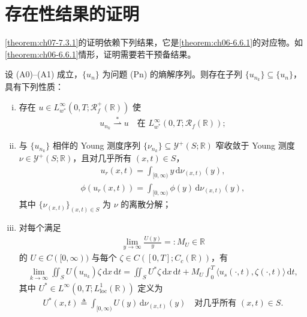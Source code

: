 \documentclass[../../main.tex]{subfiles}%
\begin{document}
\section{存在性结果的证明}\label{section:ch07-存在性证明}

\cref{theorem:ch07-7.3.1}的证明依赖下列结果，它是\cref{theorem:ch06-6.6.1}的对应物。如\cref{theorem:ch06-6.6.1}情形，证明需要若干预备结果。

\begin{theorem}\label{theorem:ch07-7.5.1}
设 (A0)--(A1) 成立，$\{u_n\}$ 为问题 (Pn) 的熵解序列。则存在子列 $\{u_{n_k}\}\subseteq\{u_n\}$，具有下列性质：
\begin{enumerate}[(i)]
\item 存在 $u\in L^\infty_{w^*}(0,T;\mathscr{R}_f^+(\mathbb{R}))$ 使
\begin{align}
u_{n_k}\stackrel{*}{\rightharpoonup}u\quad\text{在 }L^\infty_{w^*}(0,T;\mathscr{R}_f(\mathbb{R})); \label{align:ch07-7.88}
\end{align}
\item 与 $\{u_{n_k}\}$ 相伴的 Young 测度序列 $\{\nu_{n_k}\}\subseteq\mathcal{Y}^+(S;\mathbb{R})$ 窄收敛于 Young 测度 $\nu\in\mathcal{Y}^+(S;\mathbb{R})$，且对几乎所有 $(x,t)\in S$，
\begin{align}
u_r(x,t)=\int_{[0,\infty)}y\,\mathrm{d}\nu_{(x,t)}(y), \label{align:ch07-7.89}
\end{align}
\begin{align}
\phi(u_r(x,t))=\int_{[0,\infty)}\phi(y)\,\mathrm{d}\nu_{(x,t)}(y), \label{align:ch07-7.90}
\end{align}
其中 $\{\nu_{(x,t)}\}_{(x,t)\in S}$ 为 $\nu$ 的离散分解；
\item 对每个满足
\begin{align}
\lim_{y\to\infty}\frac{U(y)}{y}=:M_U\in\mathbb{R} \label{align:ch07-7.91}
\end{align}
的 $U\in C([0,\infty))$ 与每个 $\zeta\in C([0,T];C_c(\mathbb{R}))$，有
\begin{align}
\lim_{k\to\infty}\iint_S U(u_{n_k})\zeta\,\mathrm{d}x\,\mathrm{d}t
=\iint_S U^*\zeta\,\mathrm{d}x\,\mathrm{d}t+M_U\int_0^T\langle u_s(\cdot,t),\zeta(\cdot,t)\rangle\,\mathrm{d}t, \label{align:ch07-7.92}
\end{align}
其中 $U^*\in L^\infty(0,T;L^1_{\mathrm{loc}}(\mathbb{R}))$ 定义为
\begin{align}
U^*(x,t)\triangleq \int_{[0,\infty)}U(y)\,\mathrm{d}\nu_{(x,t)}(y)
\quad\text{对几乎所有 }(x,t)\in S. \label{align:ch07-7.93}
\end{align}
\end{enumerate}
\end{theorem}
\end{document}
